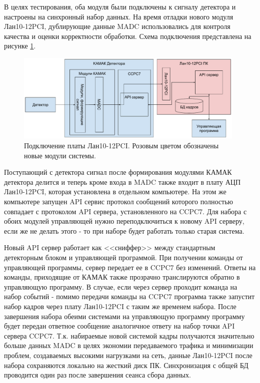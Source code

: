 \documentclass[a4paper,14pt]{extreport}
\begin{document}
В целях тестирования, оба модуля были подключены к сигналу детектора и настроены на синхронный набор данных.
На время отладки нового модуля Лан10-12PCI, дублирующие данные MADC использовались для контроля качества и оценки корректности обработки. Схема подключения представлена на рисунке \ref{fig:numass-lan10-integration}.
\begin{figure}
  \centering
  \includegraphics[width = 0.98\textwidth]{img/nu_mass_setup/lan10-integration.pdf}
    \caption{Подключение платы Лан10-12PCI. Розовым цветом обозначены новые модули системы.}
    \label{fig:numass-lan10-integration}
\end{figure}

Поступающий с детектора сигнал после формирования модулями КАМАК детектора делится и теперь кроме входа в MADC также входит в плату АЦП Лан10-12PCI, которая установлена в отдельном компьютере. На этом же компьютере запущен API сервис протокол сообщений которого полностью совпадает с протоколом API сервера, установленного на CCPC7. Для набора с обоих модулей управляющей нужно переподключиться к новому API серверу, если же не делать этого - то при наборе будет работать только старая система.

Новый API сервер работает как <<сниффер>> между стандартным детекторным блоком и управляющей программой.
При получении команды от управляющей программы, сервер передает ее в CCPC7 без изменений. Ответы на команды, приходящие от КАМАК также прозрачно транслируются обратно в управляющую программу. В случае, если через сервер проходит команда на набор событий - помимо передачи команды на CCPC7 программа также запустит набор кадров через плату Лан10-12PCI с таким же временем набора. После завершения набора обеими системами на управляющую программу программу будет передан ответное сообщение аналогичное ответу на набор точки API сервера CCPC7. Т.к. набираемые новой системой кадры получаются значительно больше данных MADC в целях экономии передаваемого трафика и минимизации проблем, создаваемых высокими нагрузками на сеть, данные  Лан10-12PCI после набора сохраняются локально на жесткий диск ПК. Синхронизация с общей БД проводится один раз после завершения сеанса сбора данных.
\end{document}
